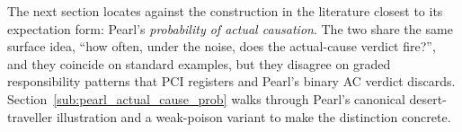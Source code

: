 The next
section locates \ourapproach against the construction in the literature closest to
its expectation form: Pearl's \emph{probability of actual causation}. The two share
the same surface idea, ``how often, under the noise, does the actual-cause
verdict fire?'', and they coincide on standard examples, but they disagree on
graded responsibility patterns that PCI registers and Pearl's binary AC verdict
discards. Section~\ref{sub:pearl_actual_cause_prob} walks through Pearl's
canonical desert-traveller illustration and a weak-poison variant to make the
distinction concrete.
